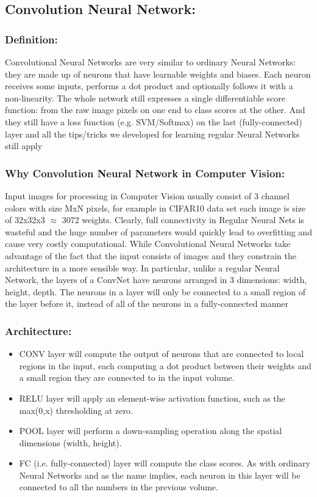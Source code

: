 \subsection{Convolution Neural Network:}
\subsubsection{Definition:}
Convolutional Neural Networks are very similar to ordinary Neural Networks: they are made up of neurons that have learnable weights and biases. Each neuron receives some inputs, performs a dot product and optionally follows it with a non-linearity. The whole network still expresses a single differentiable score function: from the raw image pixels on one end to class scores at the other. And they still have a loss function (e.g. SVM/Softmax) on the last (fully-connected) layer and all the tips/tricks we developed for learning regular Neural Networks still apply
\subsubsection{Why Convolution Neural Network in Computer Vision:}
Input images for processing in Computer Vision usually consist of 3 channel colors with size MxN pixels, for example in CIFAR10 data set each image is size of 32x32x3 $\approx$ 3072 weights. Clearly, full connectivity in Regular Neural Nets  is wasteful and the huge number of parameters would quickly lead to overfitting and cause very costly computational. While Convolutional Neural Networks take advantage of the fact that the input consists of images and they constrain the architecture in a more sensible way. In particular, unlike a regular Neural Network, the layers of a ConvNet have neurons arranged in 3 dimensions: width, height, depth. The neurons in a layer will only be connected to a small region of the layer before it, instead of all of the neurons in a fully-connected manner
\subsubsection{Architecture:}
\begin{itemize}
\item CONV layer will compute the output of neurons that are connected to local regions in the input, each computing a dot product between their weights and a small region they are connected to in the input volume. 
\item RELU layer will apply an element-wise activation function, such as the max(0,x) thresholding at zero. 
\item POOL layer will perform a down-sampling operation along the spatial dimensions (width, height).
\item FC (i.e. fully-connected) layer will compute the class scores. As with ordinary Neural Networks and as the name implies, each neuron in this layer will be connected to all the numbers in the previous volume.
\end{itemize}
